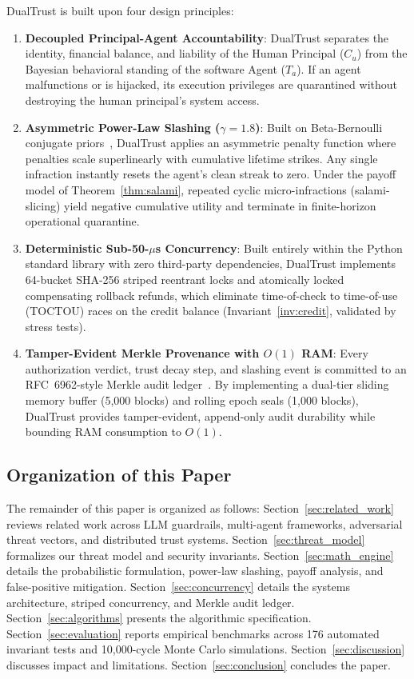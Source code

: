\documentclass[journal]{IEEEtran}
\begin{document}
DualTrust is built upon four design principles:
\begin{enumerate}[leftmargin=12pt, topsep=2pt, itemsep=1pt]
\item \textbf{Decoupled Principal-Agent Accountability}: DualTrust separates the identity, financial balance, and liability of the Human Principal ($C_u$) from the Bayesian behavioral standing of the software Agent ($T_a$). If an agent malfunctions or is hijacked, its execution privileges are quarantined without destroying the human principal's system access.
\item \textbf{Asymmetric Power-Law Slashing ($\gamma = 1.8$)}: Built on Beta-Bernoulli conjugate priors~\cite{josang2002beta}, DualTrust applies an asymmetric penalty function where penalties scale superlinearly with cumulative lifetime strikes. Any single infraction instantly resets the agent's clean streak to zero. Under the payoff model of Theorem~\ref{thm:salami}, repeated cyclic micro-infractions (salami-slicing) yield negative cumulative utility and terminate in finite-horizon operational quarantine.
\item \textbf{Deterministic Sub-50-$\mu$s Concurrency}: Built entirely within the Python standard library with zero third-party dependencies, DualTrust implements 64-bucket SHA-256 striped reentrant locks and atomically locked compensating rollback refunds, which eliminate time-of-check to time-of-use (TOCTOU) races on the credit balance (Invariant~\ref{inv:credit}, validated by stress tests).
\item \textbf{Tamper-Evident Merkle Provenance with $O(1)$ RAM}: Every authorization verdict, trust decay step, and slashing event is committed to an RFC~6962-style Merkle audit ledger~\cite{laurie2013certificate}. By implementing a dual-tier sliding memory buffer (5,000 blocks) and rolling epoch seals (1,000 blocks), DualTrust provides tamper-evident, append-only audit durability while bounding RAM consumption to $O(1)$.
\end{enumerate}

\subsection{Organization of this Paper}
The remainder of this paper is organized as follows: Section~\ref{sec:related_work} reviews related work across LLM guardrails, multi-agent frameworks, adversarial threat vectors, and distributed trust systems. Section~\ref{sec:threat_model} formalizes our threat model and security invariants. Section~\ref{sec:math_engine} details the probabilistic formulation, power-law slashing, payoff analysis, and false-positive mitigation. Section~\ref{sec:concurrency} details the systems architecture, striped concurrency, and Merkle audit ledger. Section~\ref{sec:algorithms} presents the algorithmic specification. Section~\ref{sec:evaluation} reports empirical benchmarks across 176 automated invariant tests and 10,000-cycle Monte Carlo simulations. Section~\ref{sec:discussion} discusses impact and limitations. Section~\ref{sec:conclusion} concludes the paper.
\end{document}
